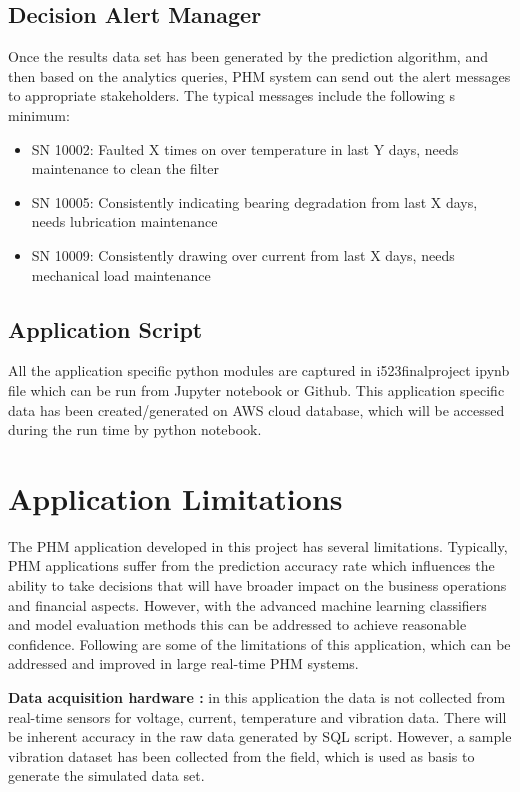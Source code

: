 \documentclass[sigconf]{acmart}
\begin{document}
\subsection{Decision Alert Manager}
Once the results data set has been generated by the prediction algorithm, and then based on the analytics queries, PHM system can send out the alert messages to appropriate stakeholders. The typical messages include the following s minimum:
\begin{itemize}
  \item SN 10002: Faulted X times on over temperature in last Y days, needs maintenance to clean the filter
  \item SN 10005: Consistently indicating bearing degradation from last X days, needs lubrication maintenance
\item SN 10009: Consistently drawing over current from last X days, needs mechanical load maintenance
\end{itemize}

\subsection{Application Script}
All the application specific python modules are captured in i523finalproject ipynb file which can be run from Jupyter notebook or Github. This application specific data has been created/generated on AWS cloud database, which will be accessed during the run time by python notebook.
\section{Application Limitations}
The PHM application developed in this project has several limitations. Typically, PHM applications suffer from the prediction accuracy rate which influences the ability to take decisions that will have broader impact on the business operations and financial aspects. However, with the advanced machine learning classifiers and model evaluation methods this can be addressed to achieve reasonable confidence. Following are some of the limitations of this application, which can be addressed and improved in large real-time PHM systems.

\textbf{Data acquisition hardware :} in this application the data is not collected from real-time sensors for voltage, current, temperature and vibration data. There will be inherent accuracy in the raw data generated by SQL script. However, a sample vibration dataset has been collected from the field, which is used as basis to generate the simulated data set.
\end{document}
